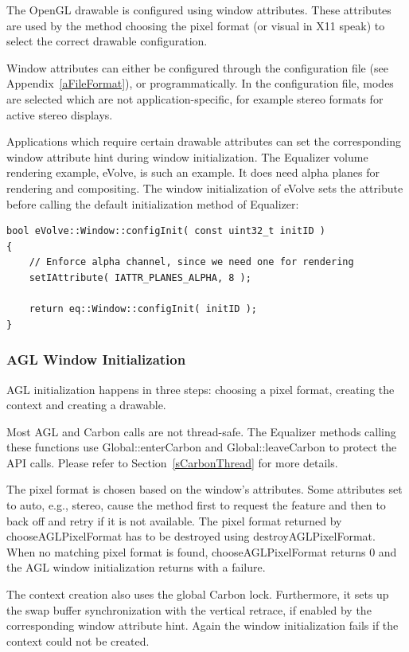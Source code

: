 \documentclass[10pt,a4]{scrartcl}
\newcommand{\sref}[1]{Section~\ref{#1}}
\newcommand{\aref}[1]{Appendix~\ref{#1}}
\begin{document}
The OpenGL drawable is configured using window attributes. These
attributes are used by the method choosing the pixel format (or visual
in X11 speak) to select the correct drawable configuration.

Window attributes can either be configured through the configuration
file (see \aref{aFileFormat}), or programmatically. In the configuration
file, modes are selected which are not application-specific, for example
stereo formats for active stereo displays. 

Applications which require certain drawable attributes can set the
corresponding window attribute hint during window initialization. The
Equalizer volume rendering example, \textsf{eVolve}, is such an
example. It does need alpha planes for rendering and compositing. The
window initialization of \textsf{eVolve} sets the attribute before
calling the default initialization method of Equalizer:

{\footnotesize\begin{lstlisting}
bool eVolve::Window::configInit( const uint32_t initID )
{
    // Enforce alpha channel, since we need one for rendering
    setIAttribute( IATTR_PLANES_ALPHA, 8 );

    return eq::Window::configInit( initID );
}
\end{lstlisting}}


\subsubsection{AGL Window Initialization}

AGL initialization happens in three steps: choosing a pixel format,
creating the context and creating a drawable. 

Most AGL and Carbon calls are not thread-safe. The Equalizer methods
calling these functions use \textsf{Global::enterCarbon} and
\textsf{Global::leaveCarbon} to protect the API calls. Please refer to
\sref{sCarbonThread} for more details.

The pixel format is chosen based on the window's attributes. Some
attributes set to auto, e.g., stereo, cause the method first to request
the feature and then to back off and retry if it is not available. The
pixel format returned by \textsf{chooseAGLPixelFormat} has to be
destroyed using \textsf{destroyAGLPixelFormat}. When no matching pixel
format is found, \textsf{chooseAGLPixelFormat} returns \textsf{0} and
the AGL window initialization returns with a failure.

The context creation also uses the global Carbon lock. Furthermore, it
sets up the swap buffer synchronization with the vertical retrace, if
enabled by the corresponding window attribute hint. Again the window
initialization fails if the context could not be created.
\end{document}

